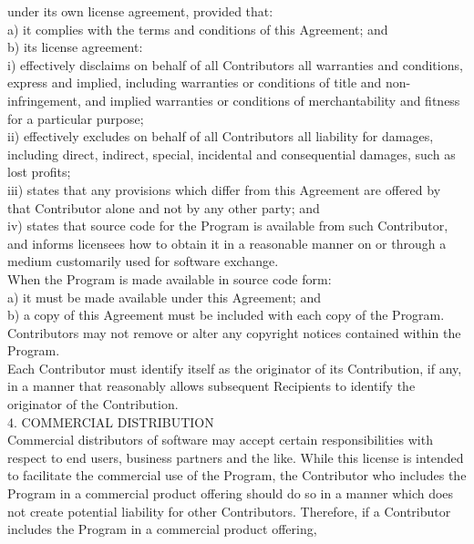 {under its own license agreement, provided that:
\\[4pt]
      a) it complies with the terms and conditions of this Agreement;
      and
\\[4pt]
      b) its license agreement:
\\[4pt]
      i) effectively disclaims on behalf of all Contributors all
      warranties and conditions, express and implied, including
      warranties or conditions of title and non-infringement, and
      implied warranties or conditions of merchantability and fitness
      for a particular purpose;
\\[4pt]
      ii) effectively excludes on behalf of all Contributors all
      liability for damages, including direct, indirect, special,
      incidental and consequential damages, such as lost profits;
\\[4pt]
      iii) states that any provisions which differ from this Agreement
      are offered by that Contributor alone and not by any other
      party; and
\\[4pt]
      iv) states that source code for the Program is available from
      such Contributor, and informs licensees how to obtain it in a
      reasonable manner on or through a medium customarily used for
      software exchange.
\\[4pt]
When the Program is made available in source code form:
\\[4pt]
      a) it must be made available under this Agreement; and 
\\[4pt]
      b) a copy of this Agreement must be included with each copy of
      the Program.
\\[4pt]
Contributors may not remove or alter any copyright notices contained
within the Program.
\\[4pt]
Each Contributor must identify itself as the originator of its
Contribution, if any, in a manner that reasonably allows subsequent
Recipients to identify the originator of the Contribution.
\\[4pt]
4. COMMERCIAL DISTRIBUTION
\\[4pt]
Commercial distributors of software may accept certain
responsibilities with respect to end users, business partners and the
like. While this license is intended to facilitate the commercial use
of the Program, the Contributor who includes the Program in a
commercial product offering should do so in a manner which does not
create potential liability for other Contributors. Therefore, if a
Contributor includes the Program in a commercial product offering,
}

